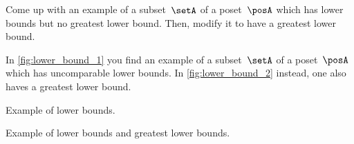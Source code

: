 \begin{exercise}
    Come up with an example of a subset~$\setA$ of a poset~$\posA$ which has lower bounds but no greatest lower bound. Then, modify it to have a greatest lower bound.
\end{exercise}

\begin{solution}
    In \cref{fig:lower_bound_1} you find an example of a subset~$\setA$ of a poset~$\posA$ which has uncomparable lower bounds.
    In \cref{fig:lower_bound_2} instead, one also haves a greatest lower bound.
    \begin{marginfigure}
        \begin{center}
        \end{center}
        \caption{Example of lower bounds. \label{fig:lower_bound_1}}
    \end{marginfigure}
    \begin{marginfigure}
        \begin{center}
        \end{center}
        \caption{Example of lower bounds and greatest lower bounds. \label{fig:lower_bound_2}}
    \end{marginfigure}
\end{solution}

